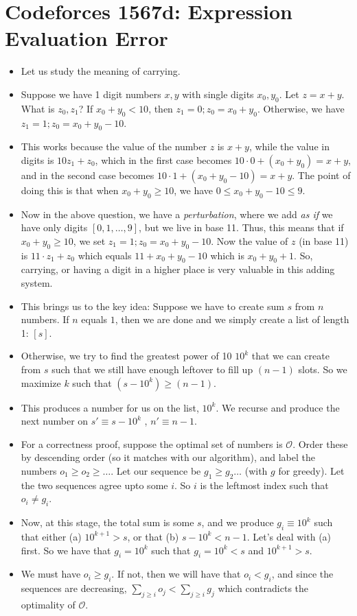 \section{Codeforces 1567d: Expression Evaluation Error}
\begin{itemize}
\item Let us study the meaning of carrying.
\item Suppose we have 1 digit
numbers $x, y$ with single digits $x_0, y_0$. Let $z = x + y$.
What is $z_0, z_1$? If $x_0 + y_0 < 10$, then $z_1 = 0; z_0 = x_0 + y_0$.
Otherwise, we have $z_1 = 1; z_0 = x_0 + y_0 - 10$.

\item This works because the value of the number $z$ is $x + y$, while
the value in digits is $10z_1 + z_0$, which in the first
case becomes $10 \cdot 0 + (x_0 + y_0) = x + y$, and in the second
case becomes $10 \cdot 1 + (x_0 + y_0 - 10) = x + y$.  The point
of doing this is that when $x_0 + y_0 \geq 10$, we have
$0 \leq x_0 + y_0 - 10 \leq 9$.

\item Now in the above question, we have a \emph{perturbation}, where we add \emph{as if} we have only digits $[0, 1, \dots, 9]$, but we live in
base 11. Thus, this means that if $x_0 + y_0 \geq 10$, we set $z_1 = 1; z_0 = x_0 + y_0 - 10$. Now the value of $z$ (in base 11) is $11 \cdot z_1 + z_0$ which equals $11 + x_0 + y_0 - 10$ which is $x_0 + y_0 + 1$. So, carrying, or having a digit in a higher place is very valuable in this adding system.

\item This brings us to the key idea: Suppose we have to create sum $s$ from $n$ numbers. If $n$ equals $1$, then we are done and we simply create a list of length 1: $[s]$.
\item Otherwise, we try to find the greatest power of 10 $10^k$ that we can
create from $s$ such that we still have enough leftover
to fill up $(n-1)$ slots. So we maximize $k$ such that $(s - 10^k) \geq (n-1)$.
\item This produces a number for us on the list, $10^k$. We recurse
 and produce the next number on $s' \equiv s - 10^k$ , $n' \equiv n - 1$.


\item For a correctness proof, suppose the optimal set of numbers is $\mathcal O$. Order these by descending order (so it matches with our algorithm), and label the numbers $o_1 \geq o_2 \geq \dots$. Let our
sequence be $g_1 \geq g_2 \dots$ (with $g$ for greedy). Let
the two sequences agree upto some $i$. So $i$ is the leftmost
index such that $o_i \neq g_i$.
\item Now, at this stage, the total sum is some $s$, and we produce $g_i \equiv 10^k$ such that either (a) $10^{k+1} > s$, or that (b) $s - 10^k < n-1$. Let's deal with (a) first. So we have that $g_i = 10^k$ such
that $g_i = 10^k < s$ and $10^{k+1} > s$.
\item We must have $o_i \geq g_i$. If not, then we will have that $o_i < g_i$, and since the sequences are decreasing, $\sum_{j \geq i} o_j < \sum_{j \geq i} g_j$ which contradicts the optimality of $\mathcal O$.



\end{itemize}
